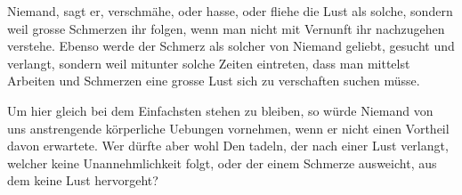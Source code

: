 \documentclass[11pt]{g-brief-jit}
\begin{document}
\begin{g-brief-jit}
Niemand, sagt er, verschmähe, oder hasse, oder fliehe die Lust als solche, sondern weil grosse Schmerzen ihr folgen, wenn man nicht mit Vernunft ihr nachzugehen verstehe. Ebenso werde der Schmerz als solcher von Niemand geliebt, gesucht und verlangt, sondern weil mitunter solche Zeiten eintreten, dass man mittelst Arbeiten und Schmerzen eine grosse Lust sich zu verschaften suchen müsse.

Um hier gleich bei dem Einfachsten stehen zu bleiben, so würde Niemand von uns anstrengende körperliche Uebungen vornehmen, wenn er nicht einen Vortheil davon erwartete. Wer dürfte aber wohl Den tadeln, der nach einer Lust verlangt, welcher keine Unannehmlichkeit folgt, oder der einem Schmerze ausweicht, aus dem keine Lust hervorgeht?

\end{g-brief-jit}
\end{document}
